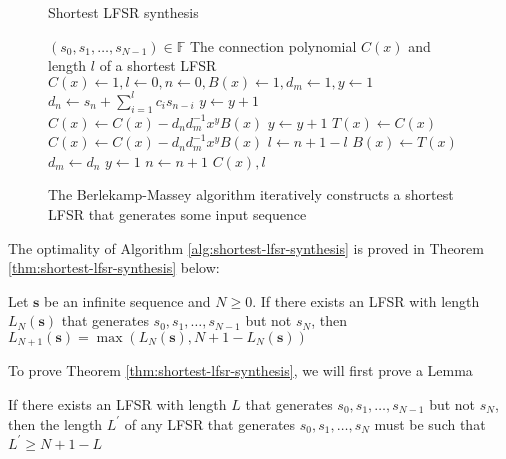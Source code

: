 \documentclass[runningheads]{llncs}
\begin{document}
\begin{figure}[h]
    \centering
    \begin{algorithm}[H]
        \caption{Shortest LFSR synthesis}\label{alg:shortest-lfsr-synthesis}
        \begin{algorithmic}[1]
            \Require $(s_0, s_1, \ldots, s_{N-1}) \in \mathbb{F}$
            \Ensure The connection polynomial $C(x)$ and length $l$ of a shortest LFSR
            \State $C(x) \leftarrow 1, l \leftarrow 0, n \leftarrow 0, B(x) \leftarrow 1, d_m \leftarrow 1, y \leftarrow 1$
                \State $d_n \leftarrow s_n + \sum_{i=1}^{l}c_is_{n-i}$
                    \State $y \leftarrow y + 1$
                    \State $C(x) \leftarrow C(x) - d_nd_m^{-1}x^yB(x)$
                    \State $y \leftarrow y + 1$
                \Else
                    \State $T(x) \leftarrow C(x)$
                    \State $C(x) \leftarrow C(x) - d_nd_m^{-1}x^yB(x)$
                    \State $l \leftarrow n + 1 - l$
                    \State $B(x) \leftarrow T(x)$
                    \State $d_m \leftarrow d_n$
                    \State $y \leftarrow 1$
                \EndIf
                \State $n \leftarrow n + 1$
            \EndWhile
            \State \Return $C(x), l$
        \end{algorithmic}
    \end{algorithm}
    \caption{The Berlekamp-Massey algorithm iteratively constructs a shortest LFSR that generates some input sequence}\label{fig:shortest-lfsr-synthesis}
\end{figure}

The optimality of Algorithm \ref{alg:shortest-lfsr-synthesis} is proved in Theorem \ref{thm:shortest-lfsr-synthesis} below:

\begin{theorem}\label{thm:shortest-lfsr-synthesis}
    Let $\mathbf{s}$ be an infinite sequence and $N \geq 0$. If there exists an LFSR with length $L_N(\mathbf{s})$ that generates $s_0, s_1, \ldots, s_{N-1}$ but not $s_{N}$, then $L_{N+1}(\mathbf{s}) = \max(L_N(\mathbf{s}), N + 1 - L_N(\mathbf{s}))$
\end{theorem}

To prove Theorem \ref{thm:shortest-lfsr-synthesis}, we will first prove a Lemma

\begin{lemma}\label{lemma:lfsr-length-change}
    If there exists an LFSR with length $L$ that generates $s_0, s_1, \ldots, s_{N-1}$ but not $s_N$, then the length $L^\prime$ of any LFSR that generates $s_0, s_1, \ldots, s_N$ must be such that $L^\prime \geq N + 1 - L$
\end{lemma}
\end{document}
